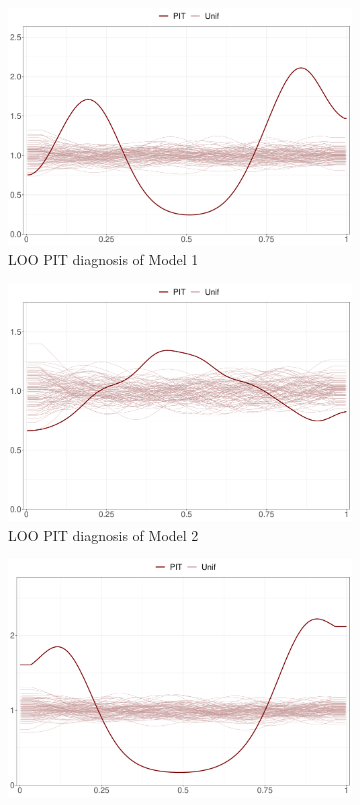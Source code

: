 \documentclass[a4paper]{article}   	%
\begin{document}
	\begin{figure}[!htp]
		\centering
		\begin{subfigure}[t]{0.45\textwidth}
			\includegraphics[width=\linewidth]{Images/pit_GSRNS}
			\caption{LOO PIT diagnosis of Model 1}
		\end{subfigure}
		\begin{subfigure}[t]{0.45\textwidth}
			\includegraphics[width=\linewidth]{Images/pit_GSRand}
			\caption{LOO PIT diagnosis of Model 2}
		\end{subfigure}
		\begin{subfigure}[t]{0.45\textwidth}
			\includegraphics[width=\linewidth]{Images/pit_STRNS}

\end{subfigure}
\end{figure}
\end{document}
